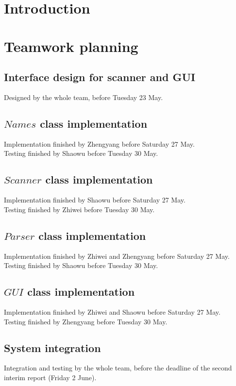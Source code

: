 \documentclass[12pt]{article}
\begin{document}
\section{Introduction}

\section{Teamwork planning}
\subsection{Interface design for scanner and GUI}
Designed by the whole team, before Tuesday 23 May.\\

\subsection{$Names$ class implementation}
Implementation finished by Zhengyang before Saturday 27 May.\\
Testing finished by Shaowu before Tuesday 30 May.

\subsection{$Scanner$ class implementation}
Implementation finished by Shaowu before Saturday 27 May.\\
Testing finished by Zhiwei before Tuesday 30 May.

\subsection{$Parser$ class implementation}
Implementation finished by Zhiwei and Zhengyang before Saturday 27 May.\\
Testing finished by Shaowu before Tuesday 30 May.

\subsection{$GUI$ class implementation}
Implementation finished by Zhiwei and Shaowu before Saturday 27 May.\\
Testing finished by Zhengyang before Tuesday 30 May.

\subsection{System integration}
Integration and testing by the whole team, before the deadline of the second interim report (Friday 2 June).
\end{document}
